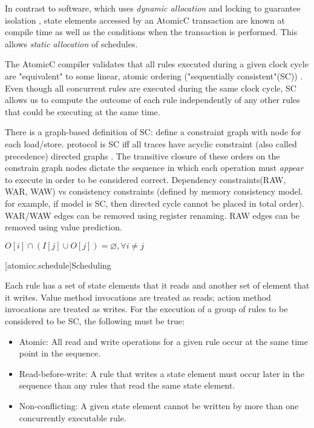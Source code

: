 In contrast to software, which uses \textit{dynamic allocation} and locking to guarantee isolation
\cite[p.~377]{GrayR93} \cite[Sec.~11.2]{OV11},
state elements accessed by an AtomicC transaction are known at compile time as well as the
conditions when the transaction is performed.  This allows \textit{static allocation}
\cite[Sec.~7.3.1]{GrayR93} of schedules.

The AtomicC compiler
validates that all rules executed during a given clock cycle are "equivalent"
to some linear, atomic ordering ("sequentially consistent"(SC))
\cite{Lamport:1979:MMC:1311099.1311750}.
Even though all concurrent rules are executed during the same clock cycle,
SC allows us to compute the
outcome of each rule independently of any other rules that could be executing at the same time.

There is a graph-based definition of SC: define a constraint graph with node for each load/store.
protocol is SC iff all traces have acyclic constraint (also called precedence) directed graphs
\cite{Cain2003}.
The transitive closure of these orders on the constrain graph nodes dictate
the sequence in which each operation must \textit{appear} to execute in order to
be considered correct.
Dependency constraints(RAW, WAR, WAW) vs consistency constraints (defined by memory consistency model.  for example, if model is SC, then directed cycle cannot be placed in total order).
WAR/WAW edges can be removed using register renaming.  RAW edges
can be removed using value prediction.

$O[i] \cap (I[j] \cup O[j]) = \varnothing, \forall i \neq j $
\cite[Sec.~7.3]{GrayR93}

[atomicc.schedule]{Scheduling}

Each rule has a set of state elements that it reads and another set of element that it writes.
Value method invocations are treated as reads; action method invocations are treated as writes.
For the execution of a group of rules to be considered to be SC, the following must
be true:
\begin{itemize}
\item Atomic: All read and write operations for a given rule occur at the same time point in the sequence.
\item Read-before-write:  A rule that writes a state element must occur later in the sequence
than any rules that read the same state element.
\item Non-conflicting: A given state element cannot be written by more than one concurrently executable rule.
\end{itemize}

